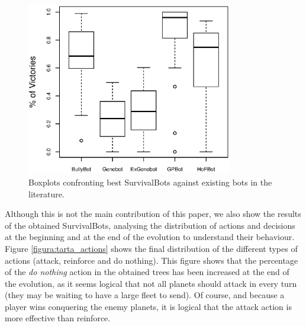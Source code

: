 \documentclass[conference]{IEEEtran}
\begin{document}
\begin{figure}[htb]
\tiny
\begin{center}
    \includegraphics[width=9cm]{./imags/boxplot_mejores_contra_clasicos.eps}

\end{center}
\caption{Boxplots confronting best SurvivalBots against existing bots in the literature.}
\label{figure:boxplot_mejores_contra_clasicos}
\end{figure}



Although this is not the main contribution of this paper, we also show the results of the obtained SurvivalBots,
analysing the distribution of actions and decisions at the beginning
and at the end of the evolution to understand their behaviour. Figure \ref{figura:tarta_actions}
shows the final distribution of the different types of actions
(attack, reinforce and do nothing). This figure shows that %
 the percentage of the {\em do
  nothing} action in the obtained trees has been increased %
at the end of the evolution, as
it seems logical that not all planets should attack in every turn
(they may be waiting to have a large fleet to send). Of course, and
because a player wins conquering the enemy planets, it is logical that
the attack action is more effective than reinforce.
\end{document}
